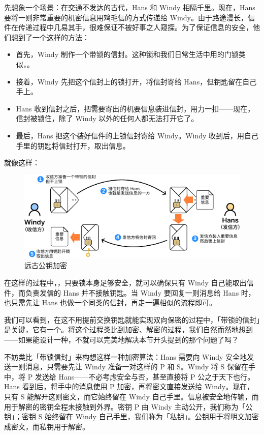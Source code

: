 先想象一个场景：在交通不发达的古代，Hans 和 Windy 相隔千里。现在，Hans 要将一则非常重要的机密信息用鸡毛信的方式传递给 Windy。由于路途漫长，信件在传递过程中几易其手，很难保证不被好事之人窥探。为了保证信息的安全，他们想到了一个这样的方法：

\begin{itemize}
  \item 首先，Windy 制作一个带锁的信封。这种锁和我们日常生活中用的门锁类似，。
  \item 接着，Windy 先把这个信封上的锁打开，将信封寄给 Hans，但钥匙留在自己手上。
  \item Hans 收到信封之后，把需要寄出的机要信息装进信封，用力一扣——现在，信封被锁住，除了 Windy 以外的任何人都无法打开它了。
  \item 最后，Hans 把这个装好信件的上锁信封寄给 Windy。Windy 收到后，用自己手里的钥匙将信封打开，取出信息。
\end{itemize}

就像这样：

\begin{figure}[htb!]
  \centering
  \includegraphics[width=.8\textwidth]{assets/surpass/Ancient_public_key_encryption.pdf}
  \caption{远古公钥加密}
  \label{fig:Ancient_public_key_encryption}
\end{figure}

在这样的过程中，，只要锁本身足够安全，就可以确保只有 Windy 自己能取出信件，而负责发信的 Hans 并不接触钥匙。当 Windy 要回复一则消息给 Hans 时，也只需先让 Hans 也做一个同类的信封，再走一遍相似的流程即可。

我们可以看到，在这不用提前交换钥匙就能实现双向保密的过程中，「带锁的信封」是关键，它有一个。将这个过程类比到加密、解密的过程，我们自然而然地想到——如果能设计一种，不就可以完美地解决本节开头提到的那个问题了吗？

不妨类比「带锁信封」来构想这样一种加密算法：Hans 需要向 Windy 安全地发送一则消息，只需要先让 Windy 准备一对这样的 P 和 S。Windy 将 S 保留在手中，将 P 发送给 Hans——不必考虑安全与否，甚至直接将 P 公之于天下也行。Hans 看到后，将手中的消息使用 P 加密，再将密文直接发送给 Windy。现在，只有 S 能解开这则密文，而它始终留在 Windy 自己手里。信息被安全地传输，而用于解密的密钥全程未接触到外界。密钥 P 由 Windy 主动公开，我们称为「公钥」；密钥 S 始终留在 Windy 自己手里，我们称为「私钥」。公钥用于将明文加密成密文，而私钥用于解密。


